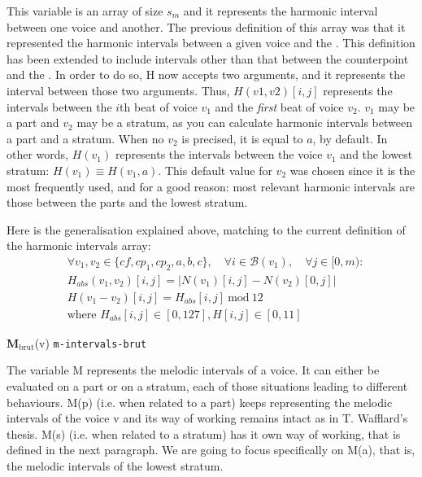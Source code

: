 This variable is an array of size $s_m$ and it represents the harmonic interval between one voice and another. The previous definition of this array was that it represented the harmonic intervals between a given voice and the \cf. This definition has been extended to include intervals other than that between the counterpoint and the \cf. In order to do so, H now accepts two arguments, and it represents the interval between those two arguments. Thus, $H(v1,v2)[i,j]$ represents the intervals between the $i$th beat of voice $v_1$ and the \textit{first} beat of voice $v_2$. $v_1$ may be a part and $v_2$ may be a stratum, as you can calculate harmonic intervals between a part and a stratum. When no $v_2$ is precised, it is equal to $a$, by default. In other words, $H(v_1)$ represents the intervals between the voice $v_1$ and the lowest stratum: $H(v_1) \equiv H(v_1,a)$. This default value for $v_2$ was chosen since it is the most frequently used, and for a good reason: most relevant harmonic intervals are those between the parts and the lowest stratum.

Here is the generalisation explained above, matching to the current definition of the harmonic intervals array:
\begin{equation}
\begin{aligned}
    &\forall v_1, v_2 \in \{\mathit{cf}, cp_1, cp_2, a, b, c\}, \quad \forall i \in \mathcal{B}(v_1), \quad \forall j \in [0, m):\\
    &H_{abs}(v_1,v_2)[i, j] = \left|N(v_1)[i, j] - N(v_2)[0,j]\right|\\
    &H(v_1-v_2)[i, j] = H_{abs}[i, j]\ \text{mod}\ 12\\
    &\text{where } H_{abs}[i, j] \in [0, 127], H[i, j] \in [0, 11]
\end{aligned}
\end{equation}

\vspace{.5cm}
\noindent \textbf{M}$_{\text{brut}}$(v) \hspace*{.2cm} \texttt{m-intervals-brut}

The variable M represents the melodic intervals of a voice. It can either be evaluated on a part or on a stratum, each of those situations leading to different behaviours. M(p) (i.e. when related to a part) keeps representing the melodic intervals of the voice v and its way of working remains intact as in T. Wafflard's thesis. M(s) (i.e. when related to a stratum) has it own way of working, that is defined in the next paragraph. We are going to focus specifically on M(a), that is, the melodic intervals of the lowest stratum.

